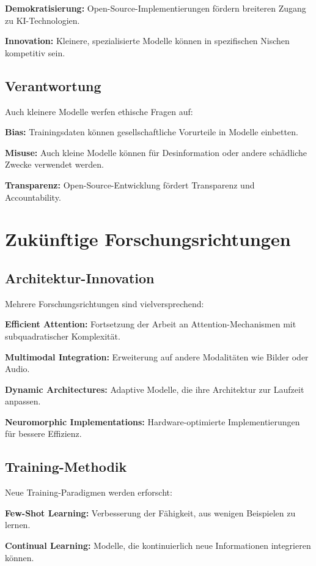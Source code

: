 \textbf{Demokratisierung:} Open-Source-Implementierungen fördern breiteren Zugang zu KI-Technologien.

\textbf{Innovation:} Kleinere, spezialisierte Modelle können in spezifischen Nischen kompetitiv sein.

\subsection{Verantwortung}

Auch kleinere Modelle werfen ethische Fragen auf:

\textbf{Bias:} Trainingsdaten können gesellschaftliche Vorurteile in Modelle einbetten.

\textbf{Misuse:} Auch kleine Modelle können für Desinformation oder andere schädliche Zwecke verwendet werden.

\textbf{Transparenz:} Open-Source-Entwicklung fördert Transparenz und Accountability.

\section{Zukünftige Forschungsrichtungen}

\subsection{Architektur-Innovation}

Mehrere Forschungsrichtungen sind vielversprechend:

\textbf{Efficient Attention:} Fortsetzung der Arbeit an Attention-Mechanismen mit subquadratischer Komplexität.

\textbf{Multimodal Integration:} Erweiterung auf andere Modalitäten wie Bilder oder Audio.

\textbf{Dynamic Architectures:} Adaptive Modelle, die ihre Architektur zur Laufzeit anpassen.

\textbf{Neuromorphic Implementations:} Hardware-optimierte Implementierungen für bessere Effizienz.

\subsection{Training-Methodik}

Neue Training-Paradigmen werden erforscht:

\textbf{Few-Shot Learning:} Verbesserung der Fähigkeit, aus wenigen Beispielen zu lernen.

\textbf{Continual Learning:} Modelle, die kontinuierlich neue Informationen integrieren können.

